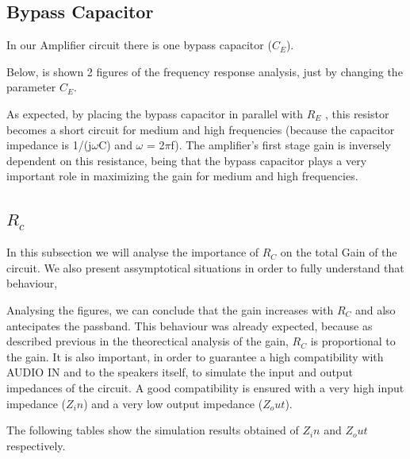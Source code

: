 \subsection{Bypass Capacitor}

In our Amplifier circuit there is one bypass capacitor ($C_E$).\par 
Below, is shown 2 figures of the frequency response analysis, just by changing the parameter $C_E$.


As expected, by placing the bypass capacitor in parallel with $R_E$ , this resistor becomes a short circuit for medium and high frequencies (because the capacitor impedance is 1/(j$\omega$C) and $\omega$ = 2$\pi$f). The amplifier’s first stage gain is inversely dependent on this resistance, being that the bypass capacitor plays a very important role in maximizing the gain for medium and high frequencies.

\subsection{$R_c$}

In this subsection we will analyse the importance of $R_C$ on the total Gain of the circuit.
We also present assymptotical situations in order to fully understand that behaviour, 


Analysing the figures, we can conclude that the gain increases with $R_C$ and also antecipates the passband.
This behaviour was already expected, because as described previous in the theorectical analysis of the gain, $R_C$ is proportional to the gain.
It is also important, in order to guarantee a high compatibility with AUDIO IN and to the 
speakers itself, to simulate the input and output impedances of the circuit. A good compatibility is ensured with a very high input impedance ($Z_in$) and a very low output impedance ($Z_out$). \par 
The following tables show the simulation results obtained of $Z_in$ and $Z_out$ respectively.

